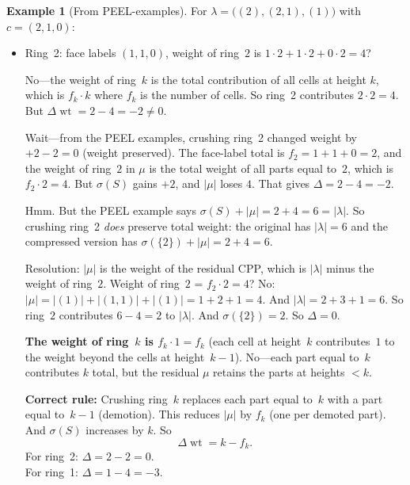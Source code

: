 \documentclass[11pt]{article}
\DeclareMathOperator{\wt}{wt}
\theoremstyle{plain}
\theoremstyle{definition}
\newtheorem{example}[theorem]{Example}
\begin{document}
\begin{example}[From PEEL-examples]
For $\lambda = \bigl((2),(2,1),(1)\bigr)$ with $c = (2,1,0)$:
\begin{itemize}
  \item Ring~2: face labels $(1,1,0)$, weight of ring~$2$
    is $1 \cdot 2 + 1 \cdot 2 + 0 \cdot 2 = 4$?

    No---the weight of ring~$k$ is the total
    contribution of all cells at height $k$, which is
    $f_k \cdot k$ where $f_k$ is the number of cells.
    So ring~2 contributes $2 \cdot 2 = 4$.  But
    $\Delta\wt = 2 - 4 = -2 \neq 0$.

    Wait---from the PEEL examples, crushing ring~2
    changed weight by $+2 - 2 = 0$ (weight preserved).
    The face-label total is $f_2 = 1 + 1 + 0 = 2$, and
    the weight of ring~$2$ in $\mu$ is the total weight
    of all parts equal to~$2$, which is
    $f_2 \cdot 2 = 4$.  But $\sigma(S)$ gains $+2$,
    and $|\mu|$ loses $4$.  That gives $\Delta = 2 - 4 = -2$.

    Hmm.  But the PEEL example says $\sigma(S) + |\mu|
    = 2 + 4 = 6 = |\lambda|$.  So crushing ring~2
    \emph{does} preserve total weight: the original has
    $|\lambda| = 6$ and the compressed version has
    $\sigma(\{2\}) + |\mu| = 2 + 4 = 6$.

    Resolution: $|\mu|$ is the weight of the residual
    CPP, which is $|\lambda|$ minus the weight of
    ring~$2$.  Weight of ring~$2$ = $f_2 \cdot 2 = 4$?
    No: $|\mu| = |(1)| + |(1,1)| + |(1)| = 1 + 2 + 1
    = 4$.  And $|\lambda| = 2 + 3 + 1 = 6$.
    So ring~$2$ contributes $6 - 4 = 2$ to $|\lambda|$.
    And $\sigma(\{2\}) = 2$.  So $\Delta = 0$. \checkmark

    \textbf{The weight of ring~$k$ is $f_k \cdot 1
    = f_k$} (each cell at height~$k$ contributes~$1$
    to the weight beyond the cells at height~$k-1$).
    No---each part equal to~$k$ contributes $k$ total,
    but the residual $\mu$ retains the parts at
    heights $< k$.

    \textbf{Correct rule:} Crushing ring~$k$ replaces
    each part equal to~$k$ with a part equal to~$k-1$
    (demotion).  This reduces $|\mu|$ by $f_k$ (one
    per demoted part).  And $\sigma(S)$ increases by $k$.
    So
    \[
      \Delta\wt = k - f_k.
    \]
    For ring~2: $\Delta = 2 - 2 = 0$. \checkmark \\
    For ring~1: $\Delta = 1 - 4 = -3$. \checkmark
  \end{itemize}
\end{example}
\end{document}
